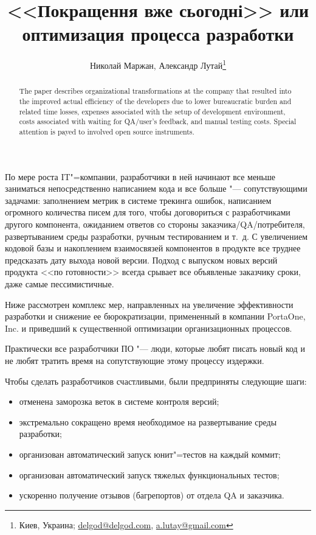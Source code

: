 \documentclass[10pt, a5paper]{article}
\begin{document}
\title{<<Покращення вже сьогодні>> или оптимизация процесса разработки}%

\author{Николай Маржан, Александр Лутай\footnote{Киев, Украина; \url{delgod@delgod.com}, \url{a.lutay@gmail.com}}}
\maketitle

\begin{abstract}
The paper describes organizational transformations at the company that resulted into the improved actual efficiency of the developers due to lower bureaucratic burden and related time losses, expenses associated with the setup of development environment, costs associated with waiting for QA/user’s feedback, and manual testing costs. Special attention is payed to involved open source instruments.
\end{abstract}

По мере роста IT"=компании, разработчики в ней начинают все меньше  заниматься непосредственно написанием кода и все больше "--- сопутствующими задачами: заполнением метрик в системе трекинга ошибок, написанием огромного количества писем для того, чтобы договориться с разработчиками другого компонента, ожиданием ответов со стороны заказчика/QA/потребителя, развертыванием среды разработки, ручным тестированием и т.~д. С увеличением кодовой базы и накоплением взаимосвязей компонентов в продукте все труднее предсказать дату выхода новой версии. Подход с выпуском новых версий продукта <<по готовности>> всегда срывает все объявленые заказчику сроки, даже самые пессимистичные.

Ниже рассмотрен комплекс мер, направленных на увеличение эффективности разработки и снижение ее бюрократизации, примененный в компании PortaOne, Inc. и приведший к существенной оптимизации организационных процессов.

Практически все разработчики ПО "--- люди, которые любят писать новый код и не любят тратить время на сопутствующие этому процессу издержки.

Чтобы сделать разработчиков счастливыми, были предприняты следующие шаги:

\begin{itemize}
  \item отменена заморозка веток в системе контроля версий;
  \item экстремально сокращено время необходимое на развертывание среды разработки;
  \item организован автоматический запуск юнит"=тестов на каждый коммит;
  \item организован автоматический запуск тяжелых функциональных тестов;
  \item ускоренно получение отзывов (багрепортов) от отдела QA и заказчика.
\end{itemize}
\end{document}
